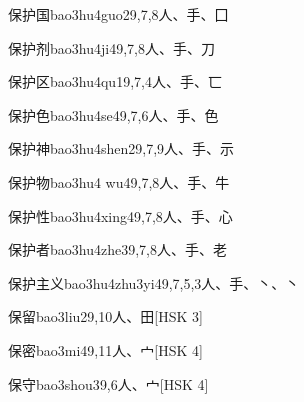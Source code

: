 \begin{entry}{保护国}{bao3hu4guo2}{9,7,8}{⼈、⼿、⼞}
\end{entry}

\begin{entry}{保护剂}{bao3hu4ji4}{9,7,8}{⼈、⼿、⼑}
\end{entry}

\begin{entry}{保护区}{bao3hu4qu1}{9,7,4}{⼈、⼿、⼖}
\end{entry}

\begin{entry}{保护色}{bao3hu4se4}{9,7,6}{⼈、⼿、⾊}
\end{entry}

\begin{entry}{保护神}{bao3hu4shen2}{9,7,9}{⼈、⼿、⽰}
\end{entry}

\begin{entry}{保护物}{bao3hu4 wu4}{9,7,8}{⼈、⼿、⽜}
\end{entry}

\begin{entry}{保护性}{bao3hu4xing4}{9,7,8}{⼈、⼿、⼼}
\end{entry}

\begin{entry}{保护者}{bao3hu4zhe3}{9,7,8}{⼈、⼿、⽼}
\end{entry}

\begin{entry}{保护主义}{bao3hu4zhu3yi4}{9,7,5,3}{⼈、⼿、⼂、⼂}
\end{entry}

\begin{entry}{保留}{bao3liu2}{9,10}{⼈、⽥}[HSK 3]
\end{entry}

\begin{entry}{保密}{bao3mi4}{9,11}{⼈、⼧}[HSK 4]
\end{entry}

\begin{entry}{保守}{bao3shou3}{9,6}{⼈、⼧}[HSK 4]
\end{entry}

